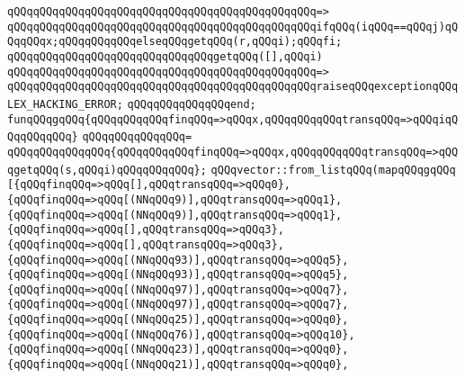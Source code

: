 \verb|qQQqqQQqqQQqqQQqqQQqqQQqqQQqqQQqqQQqqQQqqQQqqQQq=>|\newline
\verb|qQQqqQQqqQQqqQQqqQQqqQQqqQQqqQQqqQQqqQQqqQQqqQQqifqQQq(iqQQq==qQQqj)qQQqqQQqx;qQQqqQQqqQQqelseqQQqgetqQQq(r,qQQqi);qQQqfi;|\newline
\newline
\verb|qQQqqQQqqQQqqQQqqQQqqQQqqQQqqQQqgetqQQq([],qQQqi)|\newline
\verb|qQQqqQQqqQQqqQQqqQQqqQQqqQQqqQQqqQQqqQQqqQQqqQQq=>|\newline
\verb|qQQqqQQqqQQqqQQqqQQqqQQqqQQqqQQqqQQqqQQqqQQqqQQqraiseqQQqexceptionqQQqLEX_HACKING_ERROR;|\newline
\verb|qQQqqQQqqQQqqQQqend;|\newline
\verb|funqQQqgqQQq{qQQqqQQqqQQqfinqQQq=>qQQqx,qQQqqQQqqQQqtransqQQq=>qQQqiqQQqqQQqqQQq}|\newline
\verb|qQQqqQQqqQQqqQQq=|\newline
\verb|qQQqqQQqqQQqqQQq{qQQqqQQqqQQqfinqQQq=>qQQqx,qQQqqQQqqQQqtransqQQq=>qQQqgetqQQq(s,qQQqi)qQQqqQQqqQQq};|\newline
\verb|qQQqvector::from_listqQQq(mapqQQqgqQQq|\newline
\verb|[{qQQqfinqQQq=>qQQq[],qQQqtransqQQq=>qQQq0},|\newline
\verb|{qQQqfinqQQq=>qQQq[(NNqQQq9)],qQQqtransqQQq=>qQQq1},|\newline
\verb|{qQQqfinqQQq=>qQQq[(NNqQQq9)],qQQqtransqQQq=>qQQq1},|\newline
\verb|{qQQqfinqQQq=>qQQq[],qQQqtransqQQq=>qQQq3},|\newline
\verb|{qQQqfinqQQq=>qQQq[],qQQqtransqQQq=>qQQq3},|\newline
\verb|{qQQqfinqQQq=>qQQq[(NNqQQq93)],qQQqtransqQQq=>qQQq5},|\newline
\verb|{qQQqfinqQQq=>qQQq[(NNqQQq93)],qQQqtransqQQq=>qQQq5},|\newline
\verb|{qQQqfinqQQq=>qQQq[(NNqQQq97)],qQQqtransqQQq=>qQQq7},|\newline
\verb|{qQQqfinqQQq=>qQQq[(NNqQQq97)],qQQqtransqQQq=>qQQq7},|\newline
\verb|{qQQqfinqQQq=>qQQq[(NNqQQq25)],qQQqtransqQQq=>qQQq0},|\newline
\verb|{qQQqfinqQQq=>qQQq[(NNqQQq76)],qQQqtransqQQq=>qQQq10},|\newline
\verb|{qQQqfinqQQq=>qQQq[(NNqQQq23)],qQQqtransqQQq=>qQQq0},|\newline
\verb|{qQQqfinqQQq=>qQQq[(NNqQQq21)],qQQqtransqQQq=>qQQq0},|\newline
